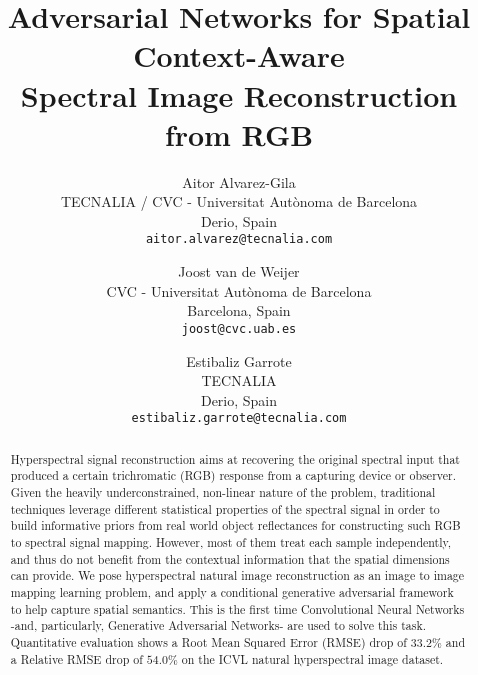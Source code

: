 \documentclass[10pt,twocolumn,letterpaper]{article}
\begin{document}
\title{Adversarial Networks for Spatial Context-Aware\\Spectral Image Reconstruction from RGB}

\author{Aitor Alvarez-Gila\\
TECNALIA / CVC - Universitat Aut\`onoma de Barcelona\\
Derio, Spain\\
{\tt\small aitor.alvarez@tecnalia.com}
\and
Joost van de Weijer\\
CVC - Universitat Aut\`onoma de Barcelona\\
Barcelona, Spain\\
{\tt\small joost@cvc.uab.es}
\and
Estibaliz Garrote\\
TECNALIA\\
Derio, Spain\\
{\tt\small estibaliz.garrote@tecnalia.com}
}

\maketitle


\begin{abstract}
   Hyperspectral signal reconstruction aims at recovering the original spectral input that produced a certain trichromatic (RGB) response from a capturing device or observer.
   Given the heavily underconstrained, non-linear nature of the problem, traditional techniques leverage different statistical properties of the spectral signal in order to build informative priors from real world object reflectances for constructing such RGB to spectral signal mapping.
   However, most of them treat each sample independently, and thus do not benefit from the contextual information that the spatial dimensions can provide. 
   We pose hyperspectral natural image reconstruction as an image to image mapping learning problem, and apply a conditional generative adversarial framework to help capture spatial semantics. 
   This is the first time Convolutional Neural Networks -and, particularly, Generative Adversarial Networks- are used to solve this task. Quantitative evaluation shows a Root Mean Squared Error (RMSE) drop of $33.2\%$ and a Relative RMSE drop of $54.0\%$ on the ICVL natural hyperspectral image dataset.
\end{abstract}
\end{document}
